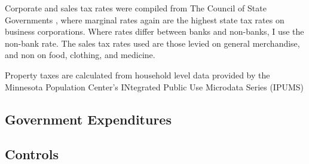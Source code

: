 \documentclass{article}
\begin{document}
Corporate and sales tax rates were compiled from The Council of State Governments , where marginal rates again are the highest state tax rates on business corporations. Where rates differ between banks and non-banks, I use the non-bank rate. The sales tax rates used are those levied on general merchandise, and non on food, clothing, and medicine.

Property taxes are calculated from household level data provided by the Minnesota Population Center's INtegrated Public Use Microdata Series (IPUMS)
\subsection{Government Expenditures}

\subsection{Controls}
\end{document}

